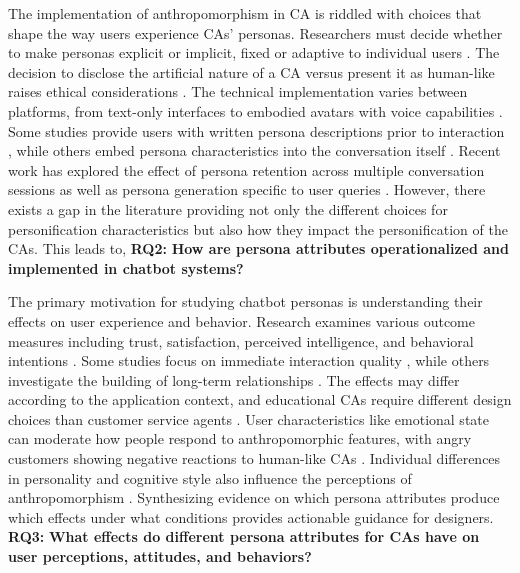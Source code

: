 \documentclass{article}
\begin{document}
The implementation of anthropomorphism in CA is riddled with choices that shape the way users experience CAs' personas. Researchers must decide whether to make personas explicit or implicit, fixed or adaptive to individual users \citep{huang2023personalized}. The decision to disclose the artificial nature of a CA versus present it as human-like raises ethical considerations \citep{araujo2018living}. The technical implementation varies between platforms, from text-only interfaces to embodied avatars with voice capabilities \citep{go2019humanizing}. Some studies provide users with written persona descriptions prior to interaction \citep{zhang2018personalizing,dinan2020second}, while others embed persona characteristics into the conversation itself \citep{song2021bob}. Recent work has explored the effect of persona retention across multiple conversation sessions \citep{xu2022beyond} as well as persona generation specific to user queries \citep{jang2022focus}. However, there exists a gap in the literature providing not only the different choices for personification characteristics but also how they impact the personification of the CAs. This leads to, \textbf{RQ2:} \textbf{How are persona attributes operationalized and implemented in chatbot systems?}

The primary motivation for studying chatbot personas is understanding their effects on user experience and behavior. Research examines various outcome measures including trust, satisfaction, perceived intelligence, and behavioral intentions \citep{konya2023anthropomorphism,blut2021understanding}. Some studies focus on immediate interaction quality \citep{go2019humanizing}, while others investigate the building of long-term relationships \citep{xu2022beyond}. The effects may differ according to the application context, and educational CAs require different design choices than customer service agents \citep{araujo2018living}. User characteristics like emotional state can moderate how people respond to anthropomorphic features, with angry customers showing negative reactions to human-like CAs \citep{crolic2022blame}. Individual differences in personality and cognitive style also influence the perceptions of anthropomorphism \citep{spatola2021personality}. Synthesizing evidence on which persona attributes produce which effects under what conditions provides actionable guidance for designers. \textbf{RQ3:} \textbf{What effects do different persona attributes for CAs have on user perceptions, attitudes, and behaviors?}
\end{document}
